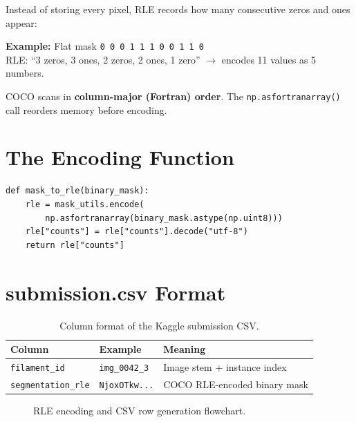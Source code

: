 \documentclass[12pt,a4paper,openany]{report}
\begin{document}
Instead of storing every pixel, RLE records how many consecutive zeros and ones appear:

\begin{defbox}
\textbf{Example:} Flat mask \texttt{0 0 0 1 1 1 0 0 1 1 0}\\
RLE: ``3 zeros, 3 ones, 2 zeros, 2 ones, 1 zero'' $\to$ encodes 11 values as 5 numbers.
\end{defbox}

COCO scans in \textbf{column-major (Fortran) order}. The \texttt{np.asfortranarray()} call
reorders memory before encoding.

\section{The Encoding Function}

\begin{lstlisting}[caption={mask\_to\_rle() from solaris.py.}]
def mask_to_rle(binary_mask):
    rle = mask_utils.encode(
        np.asfortranarray(binary_mask.astype(np.uint8)))
    rle["counts"] = rle["counts"].decode("utf-8")
    return rle["counts"]
\end{lstlisting}

\section{submission.csv Format}

\begin{table}[H]
\centering
\caption{Column format of the Kaggle submission CSV.}
\renewcommand{\arraystretch}{1.3}
\begin{tabular}{l l p{7cm}}
\toprule
\textbf{Column} & \textbf{Example} & \textbf{Meaning} \\
\midrule
\texttt{filament\_id}      & \texttt{img\_0042\_3} & Image stem + instance index \\
\texttt{segmentation\_rle} & \texttt{NjoxOTkw...}  & COCO RLE-encoded binary mask \\
\bottomrule
\end{tabular}
\label{tab:csv}
\end{table}

\begin{figure}[H]
\centering
{}
\caption{RLE encoding and CSV row generation flowchart.}
\label{fig:rle_flow}
\end{figure}
\end{document}
